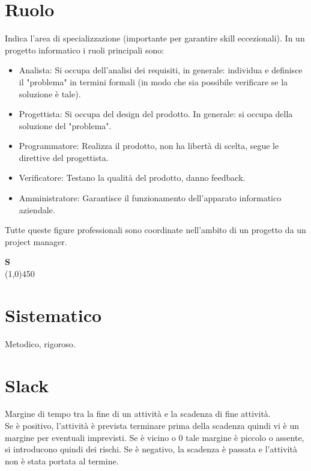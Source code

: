 	\section{Ruolo}
	\label{sec:ruolo}
	Indica l'area di specializzazione (importante per garantire skill eccezionali).
	In un progetto informatico i ruoli principali sono:
	\begin{itemize}  
	\item Analista: Si occupa dell'analisi dei requisiti, in generale: individua e definisce il "problema" in termini formali (in modo che sia possibile verificare se la soluzione è tale). 
	\item Progettista: Si occupa del design del prodotto. In generale: si occupa della soluzione del "problema".
	\item Programmatore: Realizza il prodotto, non ha libertà di scelta, segue le direttive del progettista.
	\item Verificatore: Testano la qualità del prodotto, danno feedback.
	\item Amministratore: Garantisce il funzionamento dell'apparato informatico aziendale. 
	\end{itemize}
	Tutte queste figure professionali sono coordinate nell'ambito di un progetto da un project manager.
	\newpage
	
	{\Huge{\textbf{S}}} \\
	\line(1,0){450}
	
	\section{Sistematico}
	\label{sec:sistematico}
	Metodico, rigoroso.

	\section{Slack}
	\label{sec:slack}
	Margine di tempo tra la fine di un attività e la scadenza di fine attività. \\
	Se è positivo, l'attività è prevista terminare prima della scadenza quindi vi è un margine per eventuali imprevisti. Se è vicino o 0 tale margine è piccolo o assente, si introducono quindi dei rischi. Se è negativo, la scadenza è passata e l'attività non è stata portata al termine.
	
